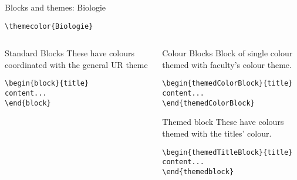 \begingroup
{}
\begin{frame}[fragile]{Blocks and themes: Biologie}
    \begin{center}\verb|\themecolor{Biologie}|\end{center}
\begin{columns} %
\begin{column}{0.3\textwidth}
\begin{block}{Standard Blocks}
These have colours coordinated with the general UR theme
\begin{verbatim}
\begin{block}{title}
content...
\end{block}
\end{verbatim}
\end{block}
\end{column}
\begin{column}{0.7\textwidth}
\begin{themedColorBlock}{Colour Blocks}
Block of single colour themed with faculty's colour theme.
\small
\begin{verbatim}
\begin{themedColorBlock}{title}
content...
\end{themedColorBlock}
\end{verbatim}
\end{themedColorBlock}
\begin{themedTitleBlock} {Themed block}
These have colours themed with the titles' colour.
\small
\begin{verbatim}
\begin{themedTitleBlock}{title}
content...
\end{themedblock}
\end{verbatim}
\end{themedTitleBlock}
\end{column}
\end{columns}
\end{frame}
\endgroup


